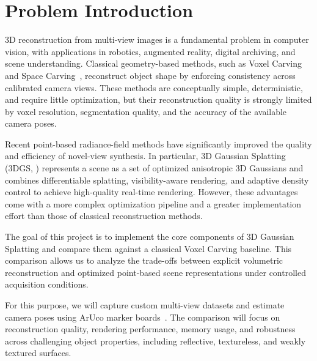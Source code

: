 \section{Problem Introduction}
\label{sec:intro}

3D reconstruction from multi-view images is a fundamental problem in computer vision, with applications in robotics, augmented reality, digital archiving, and scene understanding. Classical geometry-based methods, such as Voxel Carving and Space Carving~\cite{KutulakosSeitz2000SpaceCarving}, reconstruct object shape by enforcing consistency across calibrated camera views. These methods are conceptually simple, deterministic, and require little optimization, but their reconstruction quality is strongly limited by voxel resolution, segmentation quality, and the accuracy of the available camera poses.

Recent point-based radiance-field methods have significantly improved the quality and efficiency of novel-view synthesis. In particular, 3D Gaussian Splatting (3DGS, \cite{Kerbl2023GaussianSplatting}) represents a scene as a set of optimized anisotropic 3D Gaussians and combines differentiable splatting, visibility-aware rendering, and adaptive density control to achieve high-quality real-time rendering. However, these advantages come with a more complex optimization pipeline and a greater implementation effort than those of classical reconstruction methods.

The goal of this project is to implement the core components of 3D Gaussian Splatting and compare them against a classical Voxel Carving baseline. This comparison allows us to analyze the trade-offs between explicit volumetric reconstruction and optimized point-based scene representations under controlled acquisition conditions.

For this purpose, we will capture custom multi-view datasets and estimate camera poses using ArUco marker boards~\cite{GarridoJurado2014ArUco}. The comparison will focus on reconstruction quality, rendering performance, memory usage, and robustness across challenging object properties, including reflective, textureless, and weakly textured surfaces.
